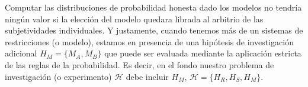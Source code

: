 \documentclass[a4paper,11pt]{book}
\theoremstyle{definition}
\newif\ifen
\newif\ifes
\newcommand{\en}[1]{\ifen#1\fi}
\newcommand{\es}[1]{\ifes#1\fi}
\begin{document}
Computar las distribuciones de probabilidad honesta dado los modelos no tendr\'ia ningún valor si la elección del modelo quedara librada al arbitrio de las subjetividades individuales.
%
Y justamente, cuando tenemos más de un sistemas de restricciones (o modelo), estamos en presencia de una hipótesis de investigación adicional $H_M = \{M_A, M_B\}$ que puede ser evaluada mediante la aplicación estricta de las reglas de la probabilidad.
%
%
Es decir, en el fondo nuestro problema de investigación (o experimento) $\mathcal{H}$ debe incluir $H_M$, $\mathcal{H} = \{H_R, H_S, H_M\}$.
%
\end{document}
